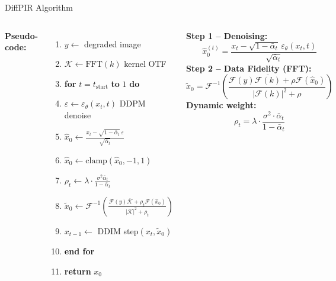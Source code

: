 \documentclass[english,10pt]{beamer}
\begin{document}
\begin{frame}{DiffPIR Algorithm}
  \begin{columns}
      \small
      \textbf{Pseudo-code:}
      \vspace{0.1cm}
      \begin{enumerate}
        \item $y \gets$ degraded image
        \item $\mathcal{K} \gets \text{FFT}(k)$ \hfill\tiny kernel OTF
        \item \textbf{for} $t = t_{\text{start}}$ \textbf{to} $1$ \textbf{do}
        \item \hspace{0.5cm}$\varepsilon \gets \varepsilon_\theta(x_t, t)$ \hfill\tiny DDPM denoise
        \item \hspace{0.5cm}$\hat{x}_0 \gets \frac{x_t - \sqrt{1-\bar{\alpha}_t}\,\varepsilon}{\sqrt{\bar{\alpha}_t}}$
        \item \hspace{0.5cm}$\hat{x}_0 \gets \text{clamp}(\hat{x}_0, -1, 1)$
        \item \hspace{0.5cm}$\rho_t \gets \lambda \cdot \frac{\sigma^2 \bar{\alpha}_t}{1 - \bar{\alpha}_t}$
        \item \hspace{0.5cm}$\tilde{x}_0 \gets \mathcal{F}^{-1}\!\left(\frac{\mathcal{F}(y)\overline{\mathcal{K}} + \rho_t\mathcal{F}(\hat{x}_0)}{|\mathcal{K}|^2 + \rho_t}\right)$
        \item \hspace{0.5cm}$x_{t-1} \gets$ DDIM step$(x_t, \tilde{x}_0)$
        \item \textbf{end for}
        \item \textbf{return} $x_0$
      \end{enumerate}
      \small
      \textbf{Step 1 -- Denoising:}
      \begin{equation*}
        \hat{x}_0^{(t)} = \frac{x_t - \sqrt{1-\bar{\alpha}_t}\,\varepsilon_\theta(x_t,t)}{\sqrt{\bar{\alpha}_t}}
      \end{equation*}
      \vspace{0.15cm}
      \textbf{Step 2 -- Data Fidelity (FFT):}
      \begin{equation*}
        \tilde{x}_0 = \mathcal{F}^{-1}\!\left(
        \frac{\mathcal{F}(y)\overline{\mathcal{F}(k)} + \rho\mathcal{F}(\hat{x}_0)}
             {|\mathcal{F}(k)|^2 + \rho}\right)
      \end{equation*}
      \vspace{0.15cm}
      \textbf{Dynamic weight:}
      \begin{equation*}
        \rho_t = \lambda \cdot \frac{\sigma^2 \cdot \bar{\alpha}_t}{1 - \bar{\alpha}_t}
      \end{equation*}
  \end{columns}
\end{frame}
\end{document}

